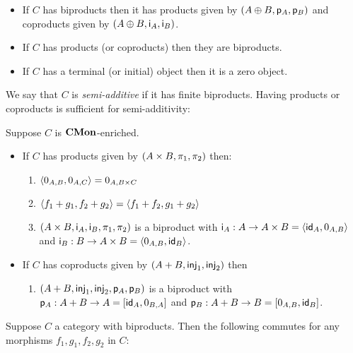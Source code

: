 \begin{proposition}
\item
\begin{itemize}
\item If $C$ has biproducts then it has products given by $(A \oplus B, \mathsf{p}_A, \mathsf{p}_B)$ and coproducts
given by $(A \oplus B, \mathsf{i}_A, \mathsf{i}_B)$.
\item If $C$ has products (or coproducts) then they are biproducts.
\item If $C$ has a terminal (or initial) object then it is a zero object.
\end{itemize}
\end{proposition}

\noindent We say that $C$ is \emph{semi-additive} if it has finite biproducts. Having products or coproducts
is sufficient for semi-additivity:

\begin{proposition}
Suppose $C$ is $\mathbf{CMon}$-enriched.
\begin{itemize}
\item If $C$ has products given by $(A \times B, \pi_1, \pi_2)$ then:
\begin{enumerate}
\item $\langle 0_{A,B}, 0_{A,C}\rangle = 0_{A,B \times C}$
\item $\langle f_1 + g_1, f_2 + g_2\rangle = \langle f_1 + f_2, g_1 + g_2\rangle$
\item $(A \times B, \mathsf{i}_A, \mathsf{i}_B, \pi_1, \pi_2)$ is a
biproduct with $\mathsf{i}_A: A \to A \times B = \langle \mathsf{id}_A, 0_{A,B}\rangle$ and $\mathsf{i}_B: B \to A \times B =
\langle 0_{A,B}, \mathsf{id}_B\rangle$.
\end{enumerate}
\item If $C$ has coproducts given by $(A + B, \mathsf{inj}_1, \mathsf{inj}_2)$ then
\begin{enumerate}
\item $(A + B, \mathsf{inj}_1, \mathsf{inj}_2, \mathsf{p}_A, \mathsf{p}_B)$ is a
biproduct with $\mathsf{p}_A: A + B \to A = [\mathsf{id}_A, 0_{B,A}]$ and $\mathsf{p}_B: A + B \to B =
[0_{A,B}, \mathsf{id}_B]$.
\end{enumerate}
\end{itemize}
\end{proposition}

\begin{proposition}
\label{prop:biproduct:prod-coprod}
Suppose $C$ a category with biproducts. Then the following commutes for any morphisms $f_1, g_1, f_2,
g_2$ in $C$:

\begin{center}
\end{center}
\end{proposition}
